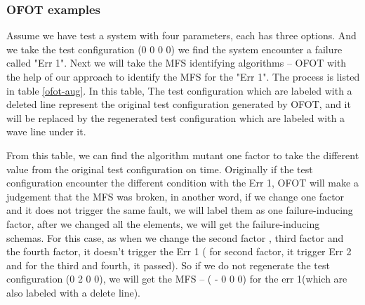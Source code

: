 \documentclass{sig-alternate}
\begin{document}
\subsubsection{OFOT examples}
Assume we have test a system with four parameters, each has three options. And we take the test configuration (0 0 0 0) we find the system encounter a failure called "Err 1". Next we will take the MFS identifying algorithms -- OFOT with the help of our approach to identify the MFS for the "Err 1". The process is listed in table \ref{ofot-aug}. In this table, The test configuration which are labeled with a deleted line represent the original test configuration generated by OFOT, and it will be replaced by the regenerated test configuration which are labeled with a wave line under it.

From this table, we can find the algorithm mutant one factor to take the different value from the original test configuration on time. Originally if the test configuration encounter the different condition with the Err 1, OFOT will make a judgement that the MFS was broken, in another word, if we change one factor and it does not trigger the same fault, we will label them as one failure-inducing factor, after we changed all the elements, we will get the failure-inducing schemas. For this case, as when we change the second factor , third factor and the fourth factor, it doesn't trigger the Err 1 ( for second factor, it trigger Err 2 and for the third and fourth, it passed). So if we do not regenerate the test configuration (0 2 0 0), we will get the MFS -- ( - 0 0 0) for the err 1(which are also labeled with a delete line).
\end{document}
